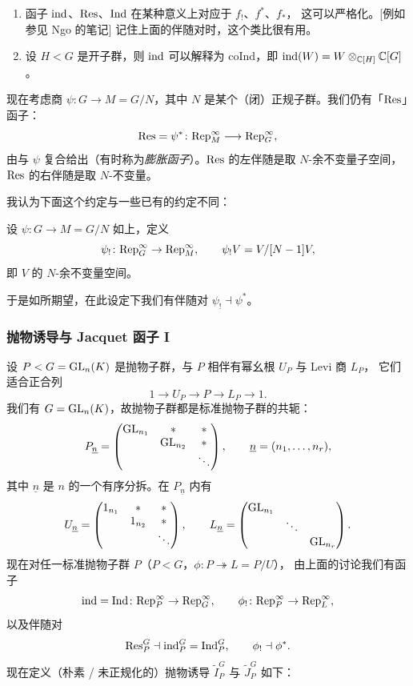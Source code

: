 \begin{remark}
\leavevmode
\begin{enumerate}[label=(\arabic*),leftmargin=2.2em]
\item 函子 $\mathrm{ind}$、$\mathrm{Res}$、$\mathrm{Ind}$ 在某种意义上对应于 $f_!$、$f^{*}$、$f_{*}$，
      这可以严格化。[例如参见 Ngo 的笔记] 记住上面的伴随对时，这个类比很有用。
\item 设 $H<G$ 是开子群，则 $\mathrm{ind}$ 可以解释为 $\mathrm{coInd}$，即
      $\mathrm{ind}(W)=W\otimes_{\mathbb{C}[H]}\mathbb{C}[G]$。
\end{enumerate}
\end{remark}

现在考虑商 $\psi\colon G\to M=G/N$，其中 $N$ 是某个（闭）正规子群。我们仍有「$\mathrm{Res}$」函子：
\[
\mathrm{Res}=\psi^{*}\colon\mathrm{Rep}^{\infty}_M\longrightarrow\mathrm{Rep}^{\infty}_G,
\]
由与 $\psi$ 复合给出（有时称为\emph{膨胀函子}）。$\mathrm{Res}$ 的左伴随是取 $N$-余不变量子空间，
$\mathrm{Res}$ 的右伴随是取 $N$-不变量。

我认为下面这个约定与一些已有的约定不同：

\begin{definition}
设 $\psi\colon G\to M=G/N$ 如上，定义
\[
\psi_{!}\colon\mathrm{Rep}^{\infty}_G\to\mathrm{Rep}^{\infty}_M,\qquad \psi_{!}V=V/[N-1]V,
\]
即 $V$ 的 $N$-余不变量空间。
\end{definition}

于是如所期望，在此设定下我们有伴随对 $\psi_{!}\dashv\psi^{*}$。

\subsubsection{抛物诱导与 Jacquet 函子 I}

设 $P<G=\mathrm{GL}_n(K)$ 是抛物子群，与 $P$ 相伴有幂幺根 $U_P$ 与 Levi 商 $L_P$，
它们适合正合列
\[
1\longrightarrow U_P\longrightarrow P\longrightarrow L_P\longrightarrow 1 .
\]
我们有 $G=\mathrm{GL}_n(K)$，故抛物子群都是标准抛物子群的共轭：
\[
P_{\underline n}=
\begin{pmatrix}
\mathrm{GL}_{n_1} & * & *\\
 & \mathrm{GL}_{n_2} & *\\
 & & \ddots
\end{pmatrix},
\qquad \underline n=(n_1,\dots,n_r),
\]
其中 $\underline n$ 是 $n$ 的一个有序分拆。在 $P_{\underline n}$ 内有
\[
U_{\underline n}=
\begin{pmatrix}
1_{n_1} & * & *\\
 & 1_{n_2} & *\\
 & & \ddots
\end{pmatrix},
\qquad
L_{\underline n}=
\begin{pmatrix}
\mathrm{GL}_{n_1} & & \\
 & \ddots & \\
 & & \mathrm{GL}_{n_r}
\end{pmatrix}.
\]
现在对任一标准抛物子群 $P$（$P<G$，$\phi\colon P\twoheadrightarrow L=P/U$），
由上面的讨论我们有函子
\[
\mathrm{ind}=\mathrm{Ind}\colon\mathrm{Rep}^{\infty}_P\to\mathrm{Rep}^{\infty}_G,\qquad
\phi_{!}\colon\mathrm{Rep}^{\infty}_P\to\mathrm{Rep}^{\infty}_L,
\]
以及伴随对
\[
\mathrm{Res}^G_P\dashv\mathrm{ind}^G_P=\mathrm{Ind}^G_P,\qquad \phi_{!}\dashv\phi^{*}.
\]
现在定义（朴素 / 未正规化的）抛物诱导 $\widetilde I^G_P$ 与 $\widetilde J^G_P$ 如下：

